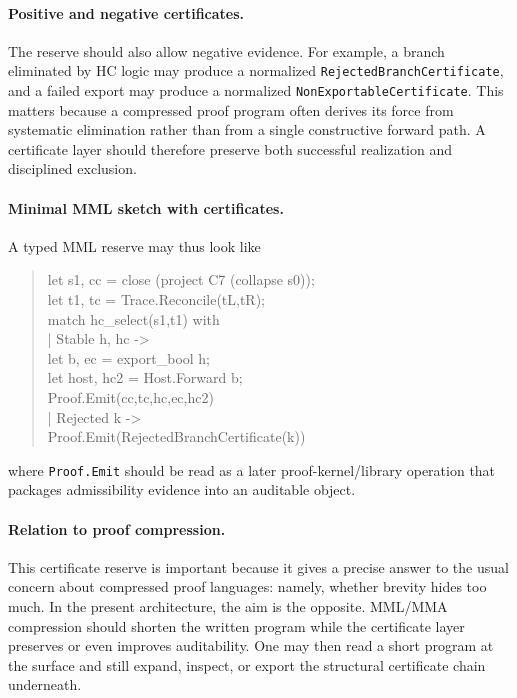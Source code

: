 \paragraph{Positive and negative certificates.}
The reserve should also allow negative evidence. For example, a branch eliminated by HC logic may produce a normalized \texttt{RejectedBranchCertificate}, and a failed export may produce a normalized \texttt{NonExportableCertificate}. This matters because a compressed proof program often derives its force from systematic elimination rather than from a single constructive forward path. A certificate layer should therefore preserve both successful realization and disciplined exclusion.

\paragraph{Minimal MML sketch with certificates.}
A typed MML reserve may thus look like
\begin{quote}
\ttfamily
let s1, cc = close (project C7 (collapse s0));\\
let t1, tc = Trace.Reconcile(tL,tR);\\
match hc\_select(s1,t1) with\\
| Stable h, hc ->\\
\quad let b, ec = export\_bool h;\\
\quad let host, hc2 = Host.Forward b;\\
\quad Proof.Emit(cc,tc,hc,ec,hc2)\\
| Rejected k ->\\
\quad Proof.Emit(RejectedBranchCertificate(k))
\end{quote}
where \texttt{Proof.Emit} should be read as a later proof-kernel/library operation that packages admissibility evidence into an auditable object.
\paragraph{Relation to proof compression.}
This certificate reserve is important because it gives a precise answer to the usual concern about compressed proof languages: namely, whether brevity hides too much. In the present architecture, the aim is the opposite. MML/MMA compression should shorten the written program while the certificate layer preserves or even improves auditability. One may then read a short program at the surface and still expand, inspect, or export the structural certificate chain underneath.

